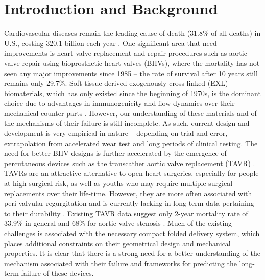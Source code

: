 \section{Introduction and Background}

    Cardiovascular diseases remain the leading cause of death (31.8\% of all deaths) in U.S., costing 320.1 billion each year \cite{mozaffarian_heart_2015}. One significant area that need improvements is heart valve replacement and repair procedures such as aortic valve repair using bioprosthetic heart valves (BHVs), where the mortality has not seen any major improvements since 1985 – the rate of survival after 10 years still remains only 29.7\%. Soft-tissue-derived exogenously cross-linked (EXL) biomaterials, which has only existed since the beginning of 1970s, is the dominant choice due to advantages in immunogenicity and flow dynamics over their mechanical counter parts \cite{starr_artificial_2007}. However, our understanding of these materials and of the mechanisms of their failure is still incomplete. As such, current design and development is very empirical in nature – depending on trial and error, extrapolation from accelerated wear test and long periods of clinical testing. The need for better BHV designs is further accelerated by the emergence of percutaneous devices such as the transcather aortic valve replacement (TAVR) \cite{bonow_accaha_2006}\cite{guidoin_marvel_2010}. TAVRs are an attractive alternative to open heart surgeries, especially for people at high surgical risk, as well as youths who may require multiple surgical replacements over their life-time. However, they are more often associated with peri-valvular regurgitation and is currently lacking in long-term data pertaining to their durability \cite{guidoin_marvel_2010}. Existing TAVR data suggest only 2-year mortality rate of 33.9\% \cite{kodali_two_2012} in general and 68\% for aortic valve stenosis \cite{makkar_transcatheter_2012}. Much of the existing challenges is associated with the necessary compact folded delivery system, which places additional constraints on their geometrical design and mechanical properties. It is clear that there is a strong need for a better understanding of the mechanism associated with their failure and frameworks for predicting the long-term failure of these devices.
        
    

    
    
    
    
    
    


